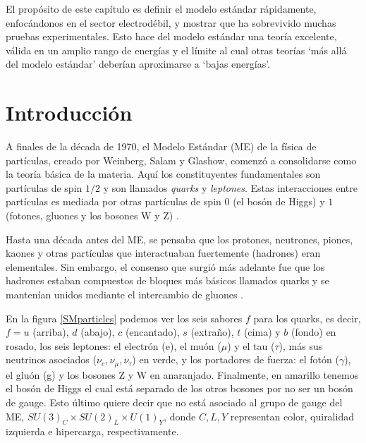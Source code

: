 El propósito de este capítulo es definir el modelo estándar rápidamente, enfocándonos en el sector electrodébil, y mostrar que ha sobrevivido muchas pruebas experimentales. Esto hace del modelo estándar una teoría excelente, válida en un amplio rango de energías y el límite al cual otras teorías `más allá del modelo estándar' deberían aproximarse a `bajas energías'.

\section[\hspace{-0.14in}Introducción]{Introducción}

A finales de la década de 1970, el Modelo Estándar (ME) de la física de partículas, creado por Weinberg, Salam y Glashow, comenzó a consolidarse como la teoría básica de la materia. Aquí los constituyentes fundamentales son partículas de spin $1/2$ y son llamados \textit{quarks} y \textit{leptones}. Estas interacciones entre partículas es mediada por otras partículas de spin $0$ (el bosón de Higgs) y $1$ (fotones, gluones y los bosones W y Z) \cite{Weinberg:1967tq}. 


Hasta una década antes del ME, se pensaba que los protones, neutrones, piones, kaones y otras partículas que interactuaban fuertemente (hadrones) eran elementales. Sin embargo, el consenso que surgió más adelante fue que los hadrones estaban compuestos de bloques más básicos llamados quarks y se mantenían unidos mediante el intercambio de gluones \cite{hoddeson1992rise}.

En la figura \ref{SMparticles} podemos ver los seis sabores $f$ para los quarks, es decir, $f= u$ (arriba), $d$ (abajo), $c$ (encantado), $s$ (extraño), $t$  (cima) y $b$ (fondo) en rosado, los seis leptones: el electrón (e), el muón ($\mu$) y el tau ($\tau$), más sus neutrinos asociados ($\nu_e, \nu_{\mu}, \nu_{\tau}$) en verde, y los portadores de fuerza: el fotón ($\gamma$), el gluón (g) y los bosones Z y W en anaranjado. Finalmente, en amarillo tenemos el bosón de Higgs el cual está separado de los otros bosones por no ser un bosón de gauge. Esto último quiere decir que no está asociado al grupo de gauge del ME, $SU(3)_C \times SU(2)_L \times U(1)_Y$, donde $C,L,Y$ representan color, quiralidad izquierda e hipercarga, respectivamente. 

